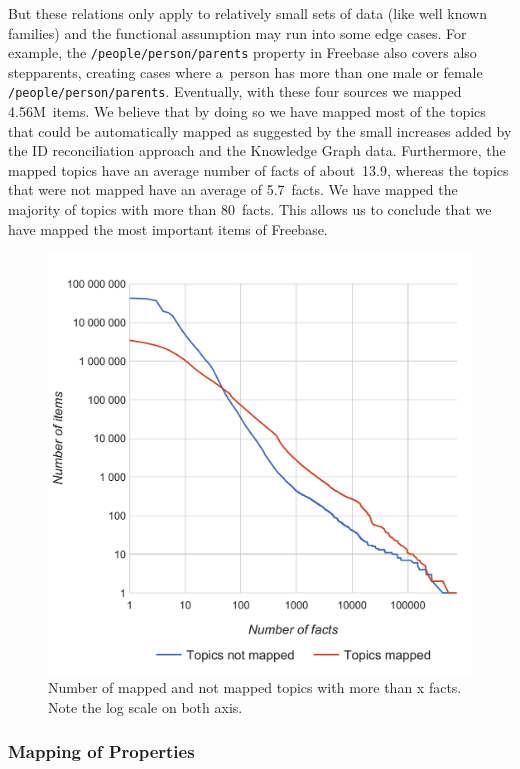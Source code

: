 \documentclass{sig-alternate}
\begin{document}
But these relations only apply to relatively small sets of data (like well known families)
and the functional assumption may run into some edge cases.
For example, the \texttt{/people/person/parents} property in Freebase also covers also stepparents,
creating cases where a~person has more than one male or female \texttt{/people/person/parents}.
Eventually, with these four sources we mapped 4.56M~items.
We believe that by doing so we have mapped most of the topics that could be automatically mapped
as suggested by the small increases added by the ID reconciliation approach
and the Knowledge Graph data.
Furthermore, the mapped topics have an average number of facts of about~13.9,
whereas the topics that were not mapped have an average of 5.7~facts.
We have mapped the majority of topics with more than 80~facts.
This allows us to conclude that we have mapped the most important items of Freebase.

\begin{figure}[!htbp]
\centering
\includegraphics[width=8.45 cm]{img/facts-topics-mapping.pdf}
\caption{Number of mapped and not mapped topics with more than x facts.
Note the log scale on both axis.}
\end{figure}

\subsubsection{Mapping of Properties}
\end{document}
